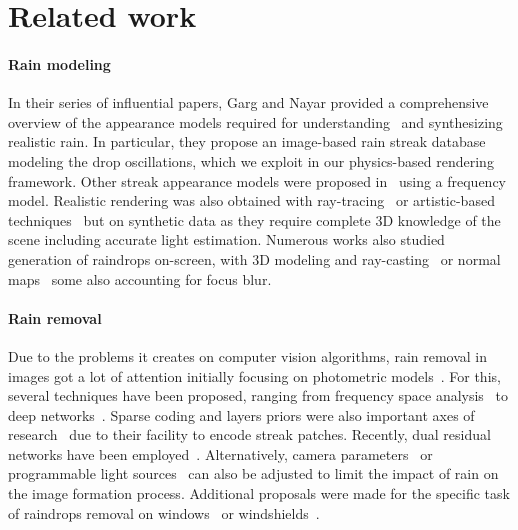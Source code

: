 \section{Related work}

\paragraph{Rain modeling} In their series of influential papers, Garg and Nayar provided a comprehensive overview of the appearance models required for understanding~\cite{garg2007vision} and synthesizing~\cite{garg2006photorealistic} realistic rain. In particular, they propose an image-based rain streak database~\cite{garg2006photorealistic} modeling the drop oscillations, which we exploit in our physics-based rendering framework. 
Other streak appearance models were proposed in~\cite{weber2015multiscale,barnum2010analysis} using a frequency model. Realistic rendering was also obtained with ray-tracing~\cite{rousseau2006realistic} or artistic-based techniques~\cite{tatarchuk2006artist,creus2013r4} but on synthetic data as they require complete 3D knowledge of the scene including accurate light estimation. Numerous works also studied generation of raindrops on-screen, with 3D modeling and ray-casting~\cite{roser2009video,roser2010realistic,halimeh2009raindrop,hao2019learning} or normal maps~\cite{porav2019can} some also accounting for focus blur.

\paragraph{Rain removal} Due to the problems it creates on computer vision algorithms, rain removal in images got a lot of attention initially focusing on photometric models~\cite{garg2004detection}. For this, several techniques have been proposed, ranging from frequency space analysis~\cite{barnum2010analysis} to deep networks~\cite{yang2017deep}. Sparse coding and layers priors were also important axes of research~\cite{li2016rain,luo2015removing,chen2013generalized} due to their facility to encode streak patches. Recently, dual residual networks have been employed~\cite{liu2019dual}.
Alternatively, camera parameters~\cite{garg2005does} or programmable light sources~\cite{de2012fast} can also be adjusted to limit the impact of rain on the image formation process. 
Additional proposals were made for the specific task of raindrops removal on windows~\cite{eigen2013restoring} or windshields~\cite{halimeh2009raindrop,porav2019can,hao2019learning}.

